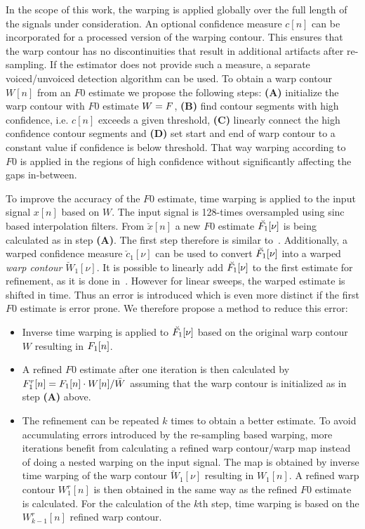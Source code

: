 In the scope of this work, the warping is applied globally over the full length of the signals under consideration. An optional confidence measure $c[n]$ can be incorporated for a processed version of the warping contour. This ensures that the warp contour has no discontinuities that result in additional artifacts after re-sampling. If the estimator does not provide such a measure, a separate voiced/unvoiced detection algorithm can be used. To obtain a warp contour $W[n]$ from an $F0$ estimate we propose the following steps: \textbf{(A)} initialize the warp contour with $F0$ estimate $W = {F}$, \textbf{(B)} find contour segments with high confidence, i.e. $c[n]$ exceeds a given threshold, \textbf{(C)} linearly connect the high confidence contour segments and \textbf{(D)} set start and end of warp contour to a constant value if confidence is below threshold. That way warping according to $F0$ is applied in the regions of high confidence without significantly affecting the gaps in-between.
\par
To improve the accuracy of the $F0$ estimate, time warping is applied to the input signal $x[n]$ based on $W$. The input signal is 128-times oversampled using sinc based interpolation filters.
From $\breve{x}[n]$ a new $F0$ estimate $\breve{{F}_1}[\nu]$ is being calculated as in step \textbf{(A)}. The first step therefore is similar to~\cite{resch07}. Additionally, a warped confidence measure $\breve{c}_1[\nu]$ can be used to convert $\breve{{F}_1}[\nu]$ into a warped \emph{warp contour} $\breve{W}_1[\nu]$. It is possible to linearly add $\breve{{F}_1}[\nu]$ to the first estimate for refinement, as it is done in~\cite{azarov12}. However for linear sweeps, the warped estimate is shifted in time. Thus an error is introduced which is even more distinct if the first $F0$ estimate is error prone. We therefore propose a method to reduce this error:
\begin{itemize}
	\item Inverse time warping is applied to $\breve{{F}_1}[\nu]$ based on the original warp contour $W$ resulting in ${F}_1[n]$.
	\item A refined $F0$ estimate after one iteration is then calculated by ${F}_1^r[n] = {F}_1[n] \cdot W[n] / \bar{W}$ assuming that the warp contour is initialized as in step \textbf{(A)} above.
	\item The refinement can be repeated $k$ times to obtain a better estimate. To avoid accumulating errors introduced by the re-sampling based warping, more iterations benefit from calculating a refined warp contour/warp map instead of doing a nested warping on the input signal. The map is obtained by inverse time warping of the warp contour $\breve{W}_1[\nu]$ resulting in $W_1[n]$. A refined warp contour $W_1^r[n]$ is then obtained in the same way as the refined $F0$ estimate is calculated. For the calculation of the $k$th step, time warping is based on the $W_{k-1}^r[n]$ refined warp contour.
\end{itemize}

